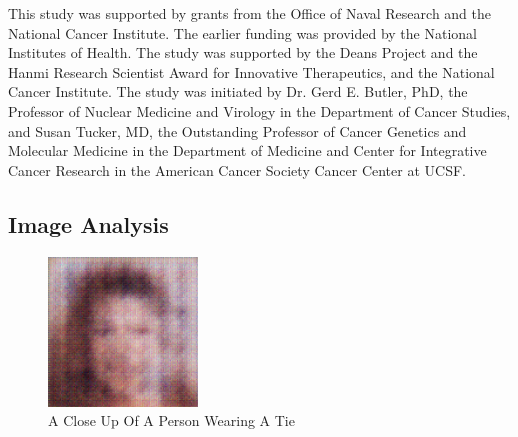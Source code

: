 \documentclass{article}%
\begin{document}
This study was supported by grants from the Office of Naval Research and the National Cancer Institute. The earlier funding was provided by the National Institutes of Health. The study was supported by the Deans Project and the Hanmi Research Scientist Award for Innovative Therapeutics, and the National Cancer Institute. The study was initiated by Dr. Gerd E. Butler, PhD, the Professor of Nuclear Medicine and Virology in the Department of Cancer Studies, and Susan Tucker, MD, the Outstanding Professor of Cancer Genetics and Molecular Medicine in the Department of Medicine and Center for Integrative Cancer Research in the American Cancer Society Cancer Center at UCSF.

%
\subsection{Image Analysis}%
\label{subsec:ImageAnalysis}%


\begin{figure}[h!]%
\centering%
\includegraphics[width=150px]{500_fake_images/samples_5_396.png}%
\caption{A Close Up Of A Person Wearing A Tie}%
\end{figure}

%
\end{document}
